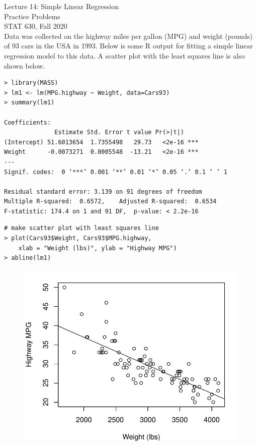 \documentclass[12pt, fleqn]{article}\usepackage[]{graphicx}\usepackage[]{color}
\begin{document}
\setlength\parindent{0pt}

Lecture 14: Simple Linear Regression\\ 
Practice Problems\\ 
STAT 630, Fall 2020\\

Data was collected on the highway miles per gallon (MPG) and weight (pounds) of 93 cars in the USA in 1993.  Below is some R output for fitting a simple linear regression model to this data.  A scatter plot with the least squares line is also shown below.
\begin{verbatim}
> library(MASS)
> lm1 <- lm(MPG.highway ~ Weight, data=Cars93)
> summary(lm1)

Coefficients:
              Estimate Std. Error t value Pr(>|t|)    
(Intercept) 51.6013654  1.7355498   29.73   <2e-16 ***
Weight      -0.0073271  0.0005548  -13.21   <2e-16 ***
---
Signif. codes:  0 ‘***’ 0.001 ‘**’ 0.01 ‘*’ 0.05 ‘.’ 0.1 ‘ ’ 1

Residual standard error: 3.139 on 91 degrees of freedom
Multiple R-squared:  0.6572,	Adjusted R-squared:  0.6534 
F-statistic: 174.4 on 1 and 91 DF,  p-value: < 2.2e-16
\end{verbatim}

\begin{verbatim}
# make scatter plot with least squares line
> plot(Cars93$Weight, Cars93$MPG.highway, 
    xlab = "Weight (lbs)", ylab = "Highway MPG")
> abline(lm1)
\end{verbatim}

\begin{figure}[ht!]
\includegraphics[scale=0.65]{figure/mpg_scatter_fit.pdf}
\end{figure} 
\clearpage
\end{document}

